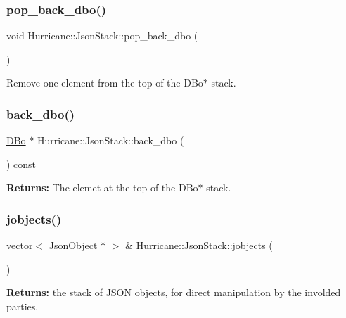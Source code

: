 \subsubsection{\texorpdfstring{pop\+\_\+back\+\_\+dbo()}{pop\_back\_dbo()}}
{\footnotesize\ttfamily void Hurricane\+::\+Json\+Stack\+::pop\+\_\+back\+\_\+dbo (\begin{DoxyParamCaption}{ }\end{DoxyParamCaption})\hspace{0.3cm}{\ttfamily [inline]}}

Remove one element from the top of the D\+Bo$\ast$ stack. \mbox{\label{classHurricane_1_1JsonStack_a95f403acdc0124c279866bd92ef8500a}} 
\subsubsection{\texorpdfstring{back\+\_\+dbo()}{back\_dbo()}}
{\footnotesize\ttfamily \mbox{\hyperlink{classHurricane_1_1DBo}{D\+Bo}} $\ast$ Hurricane\+::\+Json\+Stack\+::back\+\_\+dbo (\begin{DoxyParamCaption}{ }\end{DoxyParamCaption}) const\hspace{0.3cm}{\ttfamily [inline]}}

{\bfseries Returns\+:} The elemet at the top of the D\+Bo$\ast$ stack. \mbox{\label{classHurricane_1_1JsonStack_a974ee9daf5dbf861ed50cae0a51a5cbb}} 
\subsubsection{\texorpdfstring{jobjects()}{jobjects()}}
{\footnotesize\ttfamily vector$<$ \mbox{\hyperlink{classHurricane_1_1JsonObject}{Json\+Object}} $\ast$ $>$ \& Hurricane\+::\+Json\+Stack\+::jobjects (\begin{DoxyParamCaption}{ }\end{DoxyParamCaption})\hspace{0.3cm}{\ttfamily [inline]}}

{\bfseries Returns\+:} the stack of J\+S\+ON objects, for direct manipulation by the involded parties. 

